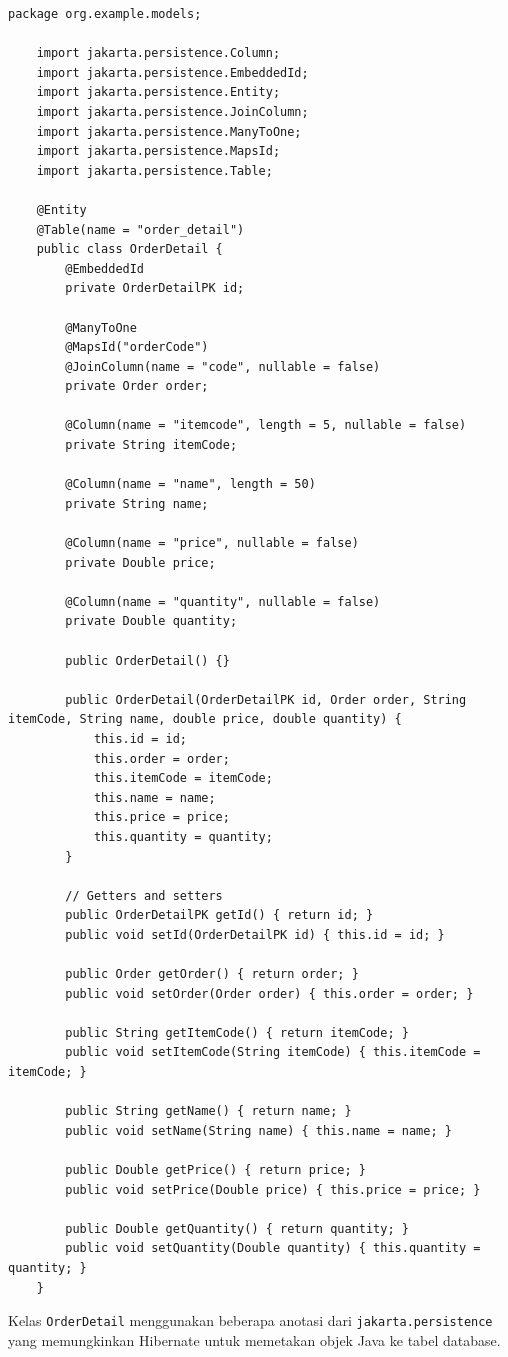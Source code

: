 \begin{lstlisting}[style=JavaStyle]
	package org.example.models;
	
	import jakarta.persistence.Column;
	import jakarta.persistence.EmbeddedId;
	import jakarta.persistence.Entity;
	import jakarta.persistence.JoinColumn;
	import jakarta.persistence.ManyToOne;
	import jakarta.persistence.MapsId;
	import jakarta.persistence.Table;
	
	@Entity
	@Table(name = "order_detail")
	public class OrderDetail {
		@EmbeddedId
		private OrderDetailPK id;
		
		@ManyToOne
		@MapsId("orderCode")
		@JoinColumn(name = "code", nullable = false)
		private Order order;
		
		@Column(name = "itemcode", length = 5, nullable = false)
		private String itemCode;
		
		@Column(name = "name", length = 50)
		private String name;
		
		@Column(name = "price", nullable = false)
		private Double price;
		
		@Column(name = "quantity", nullable = false)
		private Double quantity;
		
		public OrderDetail() {}
		
		public OrderDetail(OrderDetailPK id, Order order, String itemCode, String name, double price, double quantity) {
			this.id = id;
			this.order = order;
			this.itemCode = itemCode;
			this.name = name;
			this.price = price;
			this.quantity = quantity;
		}
		
		// Getters and setters
		public OrderDetailPK getId() { return id; }
		public void setId(OrderDetailPK id) { this.id = id; }
		
		public Order getOrder() { return order; }
		public void setOrder(Order order) { this.order = order; }
		
		public String getItemCode() { return itemCode; }
		public void setItemCode(String itemCode) { this.itemCode = itemCode; }
		
		public String getName() { return name; }
		public void setName(String name) { this.name = name; }
		
		public Double getPrice() { return price; }
		public void setPrice(Double price) { this.price = price; }
		
		public Double getQuantity() { return quantity; }
		public void setQuantity(Double quantity) { this.quantity = quantity; }
	}
\end{lstlisting}

Kelas \texttt{OrderDetail} menggunakan beberapa anotasi dari \texttt{jakarta.persistence} yang memungkinkan Hibernate untuk memetakan objek Java ke tabel database.

